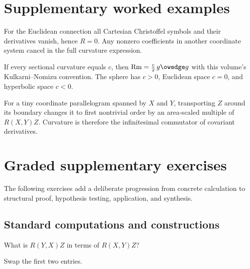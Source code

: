 \section{Supplementary worked examples}
\label{sec:vii26-pedagogy}

\begin{example}\label{ex:vii26-ped-01}
For the Euclidean connection all Cartesian Christoffel symbols and their derivatives vanish, hence \(R=0\).  Any nonzero coefficients in another coordinate system cancel in the full curvature expression.
\end{example}

\begin{example}\label{ex:vii26-ped-02}
If every sectional curvature equals \(c\), then \(\operatorname{Rm}=\tfrac c2\,g\owedge g\) with this volume's Kulkarni--Nomizu convention.  The sphere has \(c>0\), Euclidean space \(c=0\), and hyperbolic space \(c<0\).
\end{example}

\begin{example}\label{ex:vii26-ped-03}
For a tiny coordinate parallelogram spanned by \(X\) and \(Y\), transporting \(Z\) around its boundary changes it to first nontrivial order by an area-scaled multiple of \(R(X,Y)Z\).  Curvature is therefore the infinitesimal commutator of covariant derivatives.
\end{example}

\section{Graded supplementary exercises}
The following exercises add a deliberate progression from concrete calculation to structural proof, hypothesis testing, application, and synthesis.

\subsection*{Standard computations and constructions}

\begin{exercise}\label{exr:vii26-ped-01}
What is \(R(Y,X)Z\) in terms of \(R(X,Y)Z\)?
\end{exercise}

\begin{hint}
Swap the first two entries.
\end{hint}

